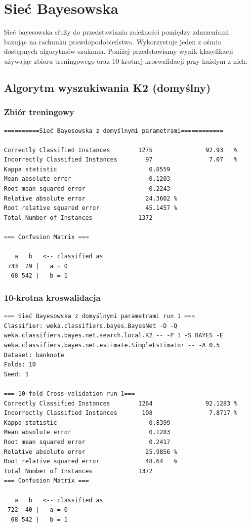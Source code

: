 \documentclass{classrep}
\begin{document}
\section{Sieć Bayesowska}
Sieć bayesowska służy do przedstawiania zależności pomiędzy zdarzeniami bazując na rachunku prawdopodobieństwa. Wykorzystuje jeden z ośmiu dostępnych algorytmów szukania. Poniżej przedstawiamy wynik klasyfikacji używając zbioru treningowego oraz 10-krotnej kroswalidacji przy każdym z nich. 
\subsection{Algorytm wyszukiwania K2 (domyślny)}
\subsubsection*{Zbiór treningowy}
\scriptsize 
\begin{verbatim}
==========Sieć Bayesowska z domyślnymi parametrami============

Correctly Classified Instances        1275               92.93   %
Incorrectly Classified Instances        97                7.07   %
Kappa statistic                          0.8559
Mean absolute error                      0.1203
Root mean squared error                  0.2243
Relative absolute error                 24.3602 %
Root relative squared error             45.1457 %
Total Number of Instances             1372     

=== Confusion Matrix ===

   a   b   <-- classified as
 733  29 |   a = 0
  68 542 |   b = 1
\end{verbatim} 
\normalsize
\subsubsection*{10-krotna kroswalidacja}
\scriptsize 
\begin{verbatim}
=== Sieć Bayesowska z domyślnymi parametrami run 1 ===
Classifier: weka.classifiers.bayes.BayesNet -D -Q
weka.classifiers.bayes.net.search.local.K2 -- -P 1 -S BAYES -E
weka.classifiers.bayes.net.estimate.SimpleEstimator -- -A 0.5
Dataset: banknote
Folds: 10
Seed: 1

=== 10-fold Cross-validation run 1===
Correctly Classified Instances        1264               92.1283 %
Incorrectly Classified Instances       108                7.8717 %
Kappa statistic                          0.8399
Mean absolute error                      0.1283
Root mean squared error                  0.2417
Relative absolute error                 25.9856 %
Root relative squared error             48.64   %
Total Number of Instances             1372     
=== Confusion Matrix ===

   a   b   <-- classified as
 722  40 |   a = 0
  68 542 |   b = 1
\end{verbatim} 
\normalsize
\end{document}
